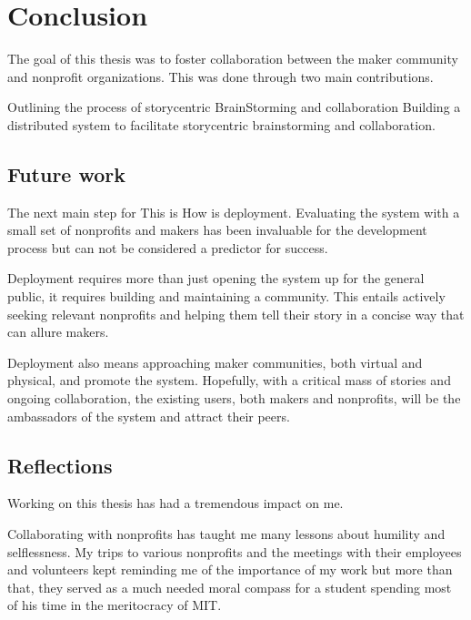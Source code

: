 

\chapter{Conclusion}
\label{chap_conclusion}

The goal of this thesis was to foster collaboration between the maker community and nonprofit organizations. This was done through two main contributions. 

Outlining the process of story­centric BrainStorming and collaboration
Building a distributed system to facilitate story­centric brainstorming and collaboration.

\section{Future work}

The next main step for This is How is deployment. Evaluating the system with a small set of nonprofits and makers has been invaluable for the development process but can not be considered a predictor for success.

Deployment requires more than just opening the system up for the general public, it requires building and maintaining a community. This entails actively seeking relevant nonprofits and helping them tell their story in a concise way that can allure makers. 

Deployment also means approaching maker communities, both virtual and physical, and promote the system. Hopefully, with a critical mass of stories and ongoing collaboration, the existing users, both makers and nonprofits, will be the ambassadors of the system and attract their peers.

\section{Reflections}

Working on this thesis has had a tremendous impact on me.

Collaborating with nonprofits has taught me many lessons about humility and selflessness. My trips to various nonprofits and the meetings with their employees and volunteers kept reminding me of the importance of my work but more than that, they served as a much needed moral compass for a student spending most of his time in the meritocracy of MIT.

